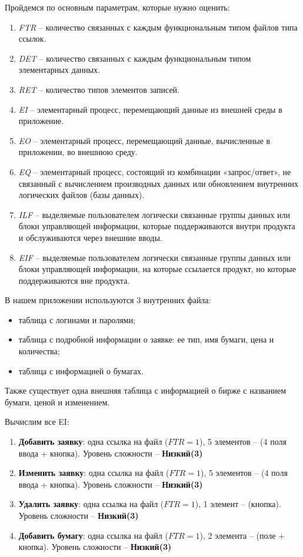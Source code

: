 Пройдемся по основным параметрам, которые нужно оценить:
\begin{enumerate}
	\item \textit{FTR} -- количество связанных с каждым функциональным типом файлов типа ссылок.
	\item \textit{DET} -- количество связанных с каждым функциональным типом элементарных данных.
	\item \textit{RET} -- количество типов элементов записей.
	\item \textit{EI} -- элементарный процесс, перемещающий данные из внешней среды в приложение.
	\item \textit{EO} -- элементарный процесс, перемещающий данные, вычисленные в приложении, во внешнюю среду.
	\item \textit{EQ} -- элементарный процесс, состоящий из комбинации «запрос/ответ», не связанный с вычислением производных данных или	обновлением внутренних логических файлов (базы данных).
	\item \textit{ILF} -- выделяемые пользователем логически связанные группы данных или блоки управляющей информации, которые поддерживаются внутри продукта и обслуживаются через внешние вводы.
	\item \textit{EIF} --  выделяемые пользователем логически связанные группы данных или блоки управляющей информации, на которые ссылается продукт, но которые поддерживаются вне продукта.
\end{enumerate}

В нашем приложении используются 3 внутренних файла:
\begin{itemize}
	\item таблица с логинами и паролями;
	\item таблица с подробной информации о заявке: ее тип, имя бумаги, цена и количества;
	\item таблица с информацией о бумагах.
\end{itemize} 

Также существует одна внешняя таблица с информацией о бирже с названием бумаги, ценой и изменением.

Вычислим все EI:
\begin{enumerate}
	\item \textbf{Добавить заявку}: одна ссылка на файл ($FTR = 1$), 5 элементов -- (4 поля ввода + кнопка). Уровень сложности -- \textbf{Низкий(3)}
	\item \textbf{Изменить заявку}: одна ссылка на файл ($FTR = 1$), 5 элементов -- (4 поля ввода + кнопка). Уровень сложности -- \textbf{Низкий(3)}
	\item \textbf{Удалить заявку}:  одна ссылка на файл ($FTR = 1$), 1 элемент -- (кнопка). Уровень сложности -- \textbf{Низкий(3)}
	\item \textbf{Добавить бумагу}: одна ссылка на файл ($FTR = 1$), 2 элемента -- (поле + кнопка). Уровень сложности -- \textbf{Низкий(3)}
\end{enumerate}

